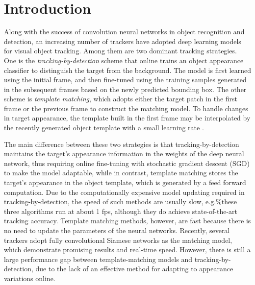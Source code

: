 \documentclass[runningheads]{llncs}
\begin{document}
\section{Introduction}

Along with the success of convolution neural networks in object recognition and detection,  an increasing number of trackers \cite{Song2017, Nam2016, Wang2015, Bertinetto2016, Guo2017} have adopted deep learning models for visual object tracking. Among them are two dominant tracking strategies. One is the {\em tracking-by-detection} scheme that online trains an object appearance classifier \cite{Song2017, Nam2016} to distinguish the target from the background. The model is first learned using the initial frame, and then fine-tuned using the training samples generated in the subsequent frames based on the newly predicted bounding box. The other scheme is {\em template matching}, which adopts either the target patch in the first frame \cite{Bertinetto2016, Tao2016} or the previous frame \cite{Held2016} to construct the matching model. To handle changes in target appearance, %
the template built in the first frame may be interpolated by the recently generated object template with a small learning rate \cite{Valmadre2017}.  

The main difference between these two strategies is that tracking-by-detection maintains the target's appearance information in the weights of the deep neural network, thus requiring online fine-tuning with stochastic gradient descent (SGD) to make the model adaptable,
while in contrast, template matching stores the target's appearance in the object template, which is generated by a feed forward computation.  Due to the computationally expensive model updating required in tracking-by-detection, the speed of such methods are usually slow, e.g.\%these three algorithms
\cite{Song2017, Nam2016, Nam2016-1} run at about 1 fps,
although they do achieve state-of-the-art tracking accuracy. 
%
Template matching methods, however, are fast %
because there is no need to update the parameters of the neural networks. Recently, several trackers \cite{Bertinetto2016, Guo2017, Yang2017} adopt fully convolutional Siamese networks as the matching model, which demonstrate promising results and real-time speed.  However, there is still a large performance gap between template-matching models and tracking-by-detection, due to the lack of an effective method for adapting to appearance variations online.
\end{document}
